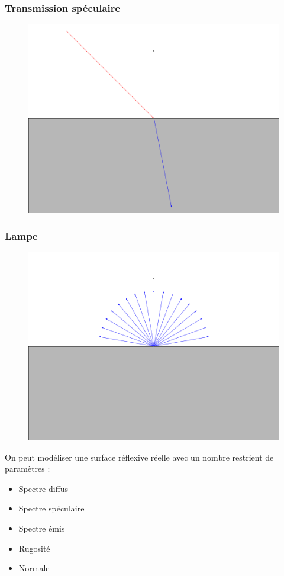\documentclass[handout]{beamer}
\begin{document}
\begin{frame}
    \frametitle{Transmission spéculaire}
    \begin{figure}
        \includegraphics[scale=0.3]{Dielectrique.png}
    \end{figure}
\end{frame}

\begin{frame}
    \frametitle{Lampe}
    \begin{figure}
        \includegraphics[scale=0.3]{Lampe.png}
    \end{figure}
\end{frame}

\begin{frame}
    On peut modéliser une surface réflexive réelle avec un nombre restrient de paramètres :
    \begin{itemize}
        \item Spectre diffus
        \item Spectre spéculaire
        \item Spectre émis
        \item Rugosité
        \item Normale
    \end{itemize}
\end{frame}
\end{document}
